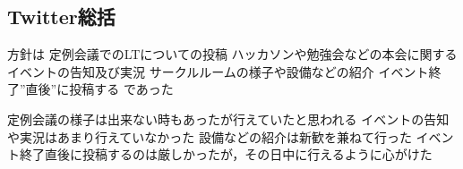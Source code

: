 \subsection*{Twitter総括}

方針は
    定例会議でのLTについての投稿
    ハッカソンや勉強会などの本会に関するイベントの告知及び実況
    サークルルームの様子や設備などの紹介
    イベント終了”直後”に投稿する
であった

定例会議の様子は出来ない時もあったが行えていたと思われる
イベントの告知や実況はあまり行えていなかった
設備などの紹介は新歓を兼ねて行った
イベント終了直後に投稿するのは厳しかったが，その日中に行えるように心がけた
